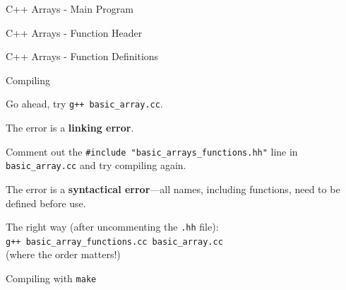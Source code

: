 \documentclass[aspectratio=1610]{beamer}
\begin{document}
\begin{frame}[allowframebreaks]{C++ Arrays - Main Program}
 
\end{frame}

\begin{frame}[allowframebreaks]{C++ Arrays - Function Header}
 
\end{frame}

\begin{frame}[allowframebreaks]{C++ Arrays - Function Definitions}
 
\end{frame}

\begin{frame}{Compiling}

 Go ahead, try {\tt g++ basic\_array.cc}.

 \pause
 
 \vfill
 The error is a {\bf linking error}.  
 
 \pause 
 
 \vfill
 Comment out the {\tt \#include "basic\_arrays\_functions.hh"} line 
 in {\tt basic\_array.cc} and try compiling again.
 
 \pause 
 \vfill
 The error is a {\bf syntactical error}---all names, including 
 functions, need to be defined before use.
 
 \pause 
 \vfill
 The right way (after uncommenting the {\tt .hh} file): \\
 
 {\tt g++ basic\_array\_functions.cc basic\_array.cc}\\
 
 (where the order matters!)
 
 
\end{frame}

\begin{frame}{Compiling with {\tt make}}
  
\end{frame}
\end{document}
